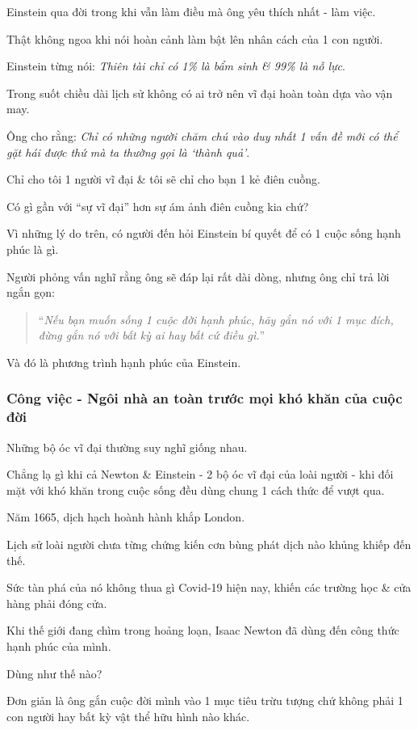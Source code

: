 \documentclass{article}
\begin{document}
Einstein qua đời trong khi vẫn làm điều mà ông yêu thích nhất - làm việc.

Thật không ngoa khi nói hoàn cảnh làm bật lên nhân cách của 1 con người.

%
Einstein từng nói: \textit{Thiên tài chỉ có 1\% là bẩm sinh \& 99\% là nỗ lực}.

Trong suốt chiều dài lịch sử không có ai trở nên vĩ đại hoàn toàn dựa vào vận may.

Ông cho rằng: \textit{Chỉ có những người chăm chú vào duy nhất 1 vấn đề mới có thể gặt hái được thứ mà ta thường gọi là `thành quả'}.

%
Chỉ cho tôi 1 người vĩ đại \& tôi sẽ chỉ cho bạn 1 kẻ điên cuồng.

Có gì gần với ``sự vĩ đại'' hơn sự ám ảnh điên cuồng kia chứ?

%
Vì những lý do trên, có người đến hỏi Einstein bí quyết để có 1 cuộc sống hạnh phúc là gì.

Người phỏng vấn nghĩ rằng ông sẽ đáp lại rất dài dòng, nhưng ông chỉ trả lời ngắn gọn:
\begin{quotation}
	``\textit{Nếu bạn muốn sống 1 cuộc đời hạnh phúc, hãy gắn nó với 1 mục đích, đừng gắn nó với bất kỳ ai hay bất cứ điều gì.}''
\end{quotation}
Và đó là phương trình hạnh phúc của Einstein.

\subsubsection{Công việc - Ngôi nhà an toàn trước mọi khó khăn của cuộc đời}
Những bộ óc vĩ đại thường suy nghĩ giống nhau.

Chẳng lạ gì khi cả Newton \& Einstein - 2 bộ óc vĩ đại của loài người - khi đối mặt với khó khăn trong cuộc sống đều dùng chung 1 cách thức để vượt qua.

%
Năm 1665, dịch hạch hoành hành khắp London.

Lịch sử loài người chưa từng chứng kiến cơn bùng phát dịch nào khủng khiếp đến thế.

Sức tàn phá của nó không thua gì Covid-19 hiện nay, khiến các trường học \& cửa hàng phải đóng cửa.

%
Khi thế giới đang chìm trong hoảng loạn, Isaac Newton đã dùng đến công thức hạnh phúc của mình.

Dùng như thế nào?

Đơn giản là ông gắn cuộc đời mình vào 1 mục tiêu trừu tượng chứ không phải 1 con người hay bất kỳ vật thể hữu hình nào khác.
\end{document}
